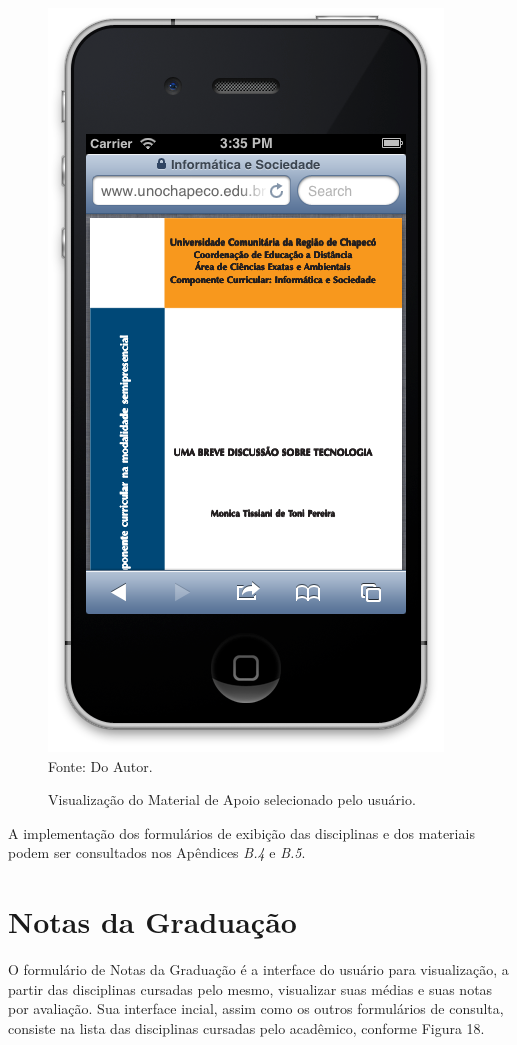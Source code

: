 \begin{figure}[!htb]
     \centering
     \caption[Formulário Material de Apoio - Visualização de Material]{Visualização do Material de Apoio selecionado pelo usuário.}
     \includegraphics[scale=0.34]{imagens/visualizacaomaterialapoio.png}
     \\  Fonte: Do Autor.
\end{figure}
\newpage

A implementação dos formulários de exibição das disciplinas e dos materiais podem ser consultados nos Apêndices \emph{B.4} e \emph{B.5}.

\section{Notas da Graduação}
O formulário de Notas da Graduação é a interface do usuário para visualização, a partir das disciplinas cursadas pelo mesmo, visualizar suas médias e suas notas por avaliação. Sua interface incial, assim como os outros formulários de consulta, consiste na lista das disciplinas cursadas pelo acadêmico, conforme Figura 18.

